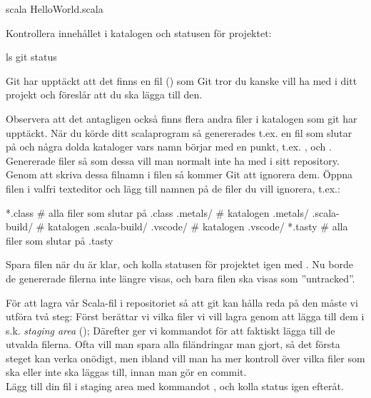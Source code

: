 \begin{Datorarbete}
	\begin{Code}
		scala HelloWorld.scala
	\end{Code}

	Kontrollera innehållet i katalogen och statusen för projektet:

	\begin{Code}
		ls
		git status
	\end{Code}

	Git har upptäckt att det finns en fil () som Git tror du kanske vill ha med i ditt projekt och föreslår att du ska lägga till den.

	Observera att det antagligen också finns flera andra filer i katalogen som git har upptäckt. När du körde ditt scalaprogram så genererades t.ex. en fil som slutar på  och några dolda kataloger vars namn börjar med en punkt, t.ex. ,  och . Genererade filer så som dessa vill man normalt inte ha med i sitt repository. Genom att skriva dessa filnamn i filen  så kommer Git att ignorera dem. Öppna filen  i valfri texteditor och lägg till namnen på de filer du vill ignorera, t.ex.:

	\begin{Code}
		*.class				# alla filer som slutar på .class
		.metals/			# katalogen .metals/
		.scala-build/		# katalogen .scala-build/
		.vscode/			# katalogen .vscode/
		*.tasty				# alla filer som slutar på .tasty
	\end{Code}


	Spara filen när du är klar, och kolla statusen för projektet igen med . Nu borde de genererade filerna inte längre visas, och bara filen  ska visas som ''untracked''.

	För att lagra vår Scala-fil i repositoriet så att git kan hålla reda på den måste vi utföra två steg: Först berättar vi vilka filer vi vill lagra genom att lägga till dem i s.k. \emph{staging area} (); Därefter ger vi kommandot  för att faktiskt lägga till de utvalda filerna. Ofta vill man spara alla filändringar man gjort, så det första steget kan verka onödigt, men ibland vill man ha mer kontroll över vilka filer som ska eller inte ska läggas till, innan man gör en commit.
	\\

	\code{[\ref{git-add}]} Lägg till din fil i staging area med kommandot , och kolla status igen efteråt.
	\\


\end{Datorarbete}
